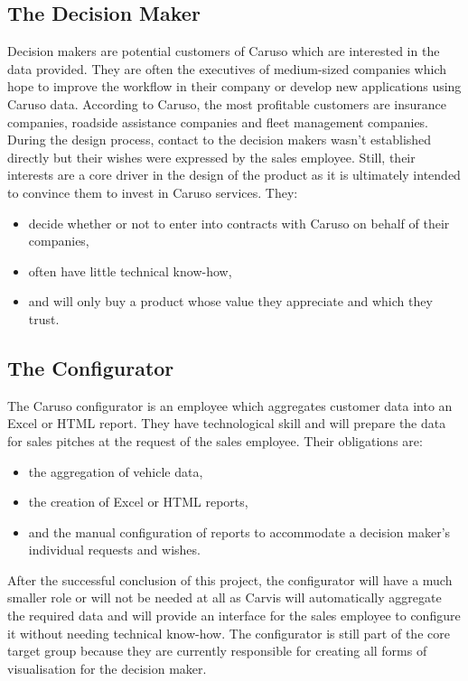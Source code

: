\subsection{The Decision Maker}
Decision makers are potential customers of Caruso which are interested in the data provided. They are often the executives of medium-sized companies which hope to improve the workflow in their company or develop new applications using Caruso data. According to Caruso, the most profitable customers are insurance companies, roadside assistance companies and fleet management companies. During the design process, contact to the decision makers wasn't established directly but their wishes were expressed by the sales employee. Still, their interests are a core driver in the design of the product as it is ultimately intended to convince them to invest in Caruso services. They:
\begin{itemize}
  \item decide whether or not to enter into contracts with Caruso on behalf of their companies,
  \item often have little technical know-how,
  \item and will only buy a product whose value they appreciate and which they trust.
\end{itemize}

\subsection{The Configurator}
The Caruso configurator is an employee which aggregates customer data into an Excel or HTML report. They have technological skill and will prepare the data for sales pitches at the request of the sales employee. Their obligations are:
\begin{itemize}
  \item the aggregation of vehicle data,
  \item the creation of Excel or HTML reports,
  \item and the manual configuration of reports to accommodate a decision maker's individual requests and wishes.
\end{itemize}
After the successful conclusion of this project, the configurator will have a much smaller role or will not be needed at all as Carvis will automatically aggregate the required data and will provide an interface for the sales employee to configure it without needing technical know-how. The configurator is still part of the core target group because they are currently responsible for creating all forms of visualisation for the decision maker.


